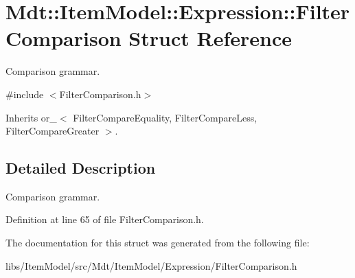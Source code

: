 \hypertarget{struct_mdt_1_1_item_model_1_1_expression_1_1_filter_comparison}{}\section{Mdt\+:\+:Item\+Model\+:\+:Expression\+:\+:Filter\+Comparison Struct Reference}
\label{struct_mdt_1_1_item_model_1_1_expression_1_1_filter_comparison}


Comparison grammar.  




{\ttfamily \#include $<$Filter\+Comparison.\+h$>$}



Inherits or\+\_\+$<$ Filter\+Compare\+Equality, Filter\+Compare\+Less, Filter\+Compare\+Greater $>$.



\subsection{Detailed Description}
Comparison grammar. 

Definition at line 65 of file Filter\+Comparison.\+h.



The documentation for this struct was generated from the following file\+:\begin{DoxyCompactItemize}
\item 
libs/\+Item\+Model/src/\+Mdt/\+Item\+Model/\+Expression/Filter\+Comparison.\+h\end{DoxyCompactItemize}

